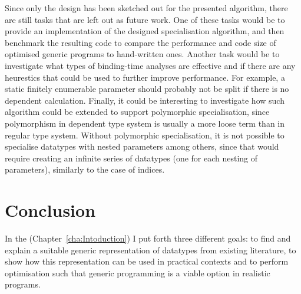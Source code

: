 \documentclass{ituthesis}
\theoremstyle{break}
\begin{document}
Since only the design has been sketched out for the presented algorithm, there are still tasks that are left out as future work.
One of these tasks would be to provide an implementation of the designed specialisation algorithm, and then benchmark the resulting code to compare the performance and code size of optimised generic programs to hand-written ones.
Another task would be to investigate what types of binding-time analyses are effective and if there are any heurestics that could be used to further improve performance.
For example, a static finitely enumerable parameter should probably not be split if there is no dependent calculation.
Finally, it could be interesting to investigate how such algorithm could be extended to support polymorphic specialisation, since polymorphism in dependent type system is usually a more loose term than in regular type system.
Without polymorphic specialisation, it is not possible to specialise datatypes with nested parameters among others, since that would require creating an infinite series of datatypes (one for each nesting of parameters), similarly to the case of indices.





\chapter{Conclusion}
\label{cha:Conclusion}
In the  (Chapter~\ref{cha:Intoduction}) I put forth three different goals: to find and explain a suitable generic representation of datatypes from existing literature, to show how this representation can be used in practical contexts and to perform optimisation such that generic programming is a viable option in realistic programs.
\end{document}
